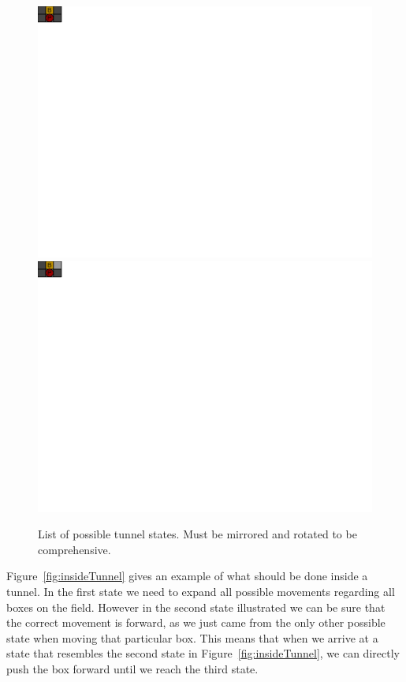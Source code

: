 \documentclass[a4paper,12pt]{article}
\renewcommand{\*}[0]{\cdot}
\begin{document}
\begin{figure}[h!]
    \begin{center}
        \includegraphics{figures/tunnelPossibilities1}
        \includegraphics{figures/tunnelPossibilities2}
    \end{center}
    \caption{List of possible tunnel states. Must be mirrored and rotated to be
    comprehensive.}
    \label{fig:tunnelPossibilities}
\end{figure}


Figure~\ref{fig:insideTunnel} gives an example of what should be done inside a
tunnel. In the first state we need to expand all possible movements regarding
all boxes on the field. However in the second state illustrated we can be sure
that the correct movement is forward, as we just came from the only other
possible state when moving that particular box. This means that when we arrive
at a state that resembles the second state in Figure~\ref{fig:insideTunnel}, we
can directly push the box forward until we reach the third state.
\end{document}
